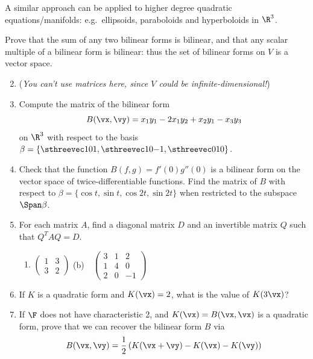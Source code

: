 A similar approach can be applied to higher degree quadratic equations/manifolds: e.g.\ ellipsoids, paraboloids and hyperboloids in $\R^3$.

\vfil
 
\begin{exercises}
\exstart Prove that the sum of any two bilinear forms is bilinear, and that any scalar multiple of a bilinear form is bilinear: thus the set of bilinear forms on $V$ is a vector space.\vspace{-5pt}
  
\begin{enumerate}\setcounter{enumi}{1}
  \item[](\emph{You can't use matrices here, since $V$ could be infinite-dimensional!}) 
  \item Compute the matrix of the bilinear form
  \[B(\vx,\vy)=x_1y_1-2x_1y_2+x_2y_1-x_3y_3\]
  on $\R^3$ with respect to the basis $\beta=\left\{\sthreevec 101,\sthreevec 10{-1},\sthreevec 010\right\}$.
  
  \goodbreak
  
  \item Check that the function $B(f,g)=f'(0)g''(0)$ is a bilinear form on the vector space of twice-differentiable functions. Find the matrix of $B$ with respect to $\beta=\{\cos t,\sin t,\cos 2t,\sin 2t\}$ when restricted to the subspace $\Span\beta$.
  
  \item For each matrix $A$, find a diagonal matrix $D$ and an invertible matrix $Q$ such that $Q^TAQ=D$.
  \begin{enumerate}
    \item $\begin{pmatrix}
    1&3\\3&2
    \end{pmatrix}$\qquad
    (b)\ \ $\begin{pmatrix}
    3&1&2\\1&4&0\\2&0&-1
    \end{pmatrix}$
  \end{enumerate}
  
  \item If $K$ is a quadratic form and $K(\vx)=2$, what is the value of $K(3\vx)$?
  
  \item If $\F$ does not have characteristic 2, and $K(\vx)=B(\vx,\vx)$ is a quadratic form, prove that we can recover the bilinear form $B$ via
		\[B(\vx,\vy)=\frac 12\left(K(\vx+\vy)-K(\vx)-K(\vy)\right)\]
  

\end{enumerate}
\end{exercises}
